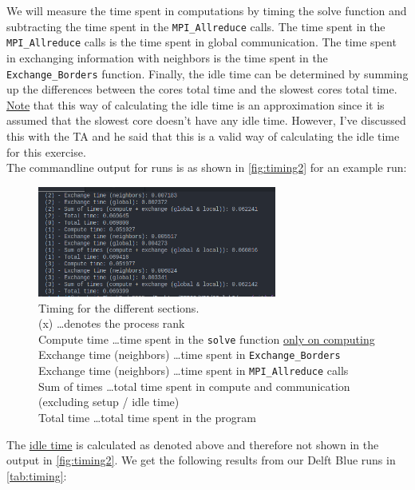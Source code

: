 We will measure the time spent in computations by timing the solve function and subtracting the time spent in the \texttt{MPI\_Allreduce} calls. The time spent in the \texttt{MPI\_Allreduce} calls is the time spent in global communication. The time spent in exchanging information with neighbors is the time spent in the \texttt{Exchange\_Borders} function. Finally, the idle time can be determined by summing up the differences between the cores total time and the slowest cores total time. \underline{Note} that this way of calculating the idle time is an approximation since it is assumed that the slowest core doesn't have any idle time. However, I've discussed this with the TA and he said that this is a valid way of calculating the idle time for this exercise.\\
The commandline output for runs is as shown in \autoref{fig:timing2} for an example run: 
\begin{figure}[H]
    \centering
    \includegraphics[width=0.7\textwidth]{../fig/lab2/ex2.png}
    \caption{Timing for the different sections.\\
    (x) \dots denotes the process rank\\
    Compute time \dots time spent in the \texttt{solve} function \underline{only on computing}\\
    Exchange time (neighbors) \dots time spent in \texttt{Exchange\_Borders} \\
    Exchange time (neighbors) \dots time spent in \texttt{MPI\_Allreduce} calls \\
    Sum of times \dots total time spent in compute and communication (excluding setup / idle time)\\
    Total time \dots total time spent in the program\\
    }
    \label{fig:timing2}
\end{figure}

The \underline{idle time} is calculated as denoted above and therefore not shown in the output in \autoref{fig:timing2}. We get the following results from our Delft Blue runs in \autoref{tab:timing}:


